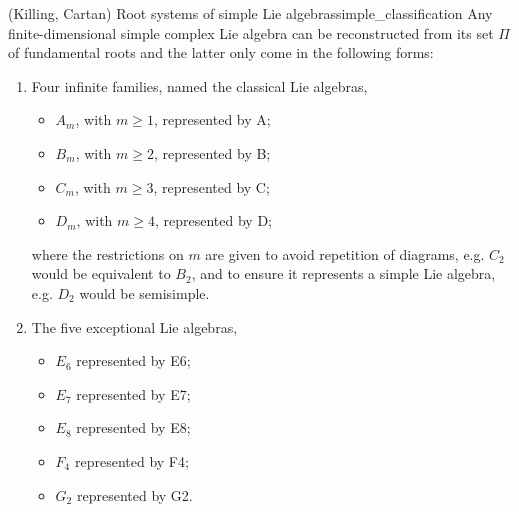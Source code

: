 \begin{theorem}{(Killing, Cartan) Root systems of simple Lie algebras}{simple_classification}
    Any finite-dimensional simple complex Lie algebra can be reconstructed from its set \(\Pi\) of fundamental roots and the latter only come in the following forms:
    \begin{enumerate}[label=(\alph*)]
        \item Four infinite families, named the classical Lie algebras,
            \begin{itemize}
                \item \(A_m\), with \(m \geq 1\), represented by \dynkin A{};
                \item \(B_m\), with \(m \geq 2\), represented by \dynkin B{};
                \item \(C_m\), with \(m \geq 3\), represented by \dynkin C{};
                \item \(D_m\), with \(m \geq 4\), represented by \dynkin D{};
            \end{itemize}
            where the restrictions on \(m\) are given to avoid repetition of diagrams, e.g. \(C_2\) would be equivalent to \(B_2\), and to ensure it represents a simple Lie algebra, e.g. \(D_2\) would be semisimple.
        \item The five exceptional Lie algebras,
            \begin{itemize}
                \item \(E_6\) represented by \dynkin E6;
                \item \(E_7\) represented by \dynkin E7;
                \item \(E_8\) represented by \dynkin E8;
                \item \(F_4\) represented by \dynkin F4;
                \item \(G_2\) represented by \dynkin G2.
            \end{itemize}
    \end{enumerate}
\end{theorem}
